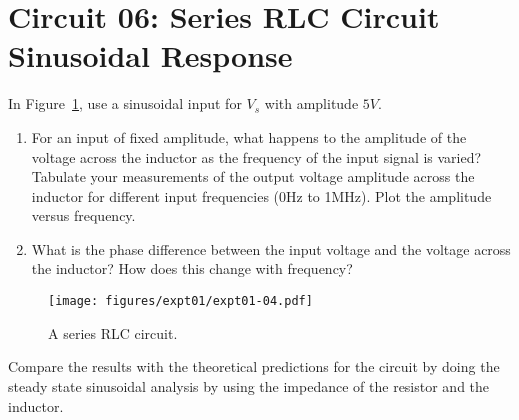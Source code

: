 \section{Circuit 06: Series RLC Circuit Sinusoidal Response}
In Figure~\ref{fig:expt01-04}, use a sinusoidal input for $V_s$ with amplitude $5V$. 
\begin{enumerate}
    \item For an input of fixed amplitude, what happens to the amplitude of the voltage across the inductor as the frequency of the input signal is varied? Tabulate your measurements of the output voltage amplitude across the inductor for different input frequencies (0Hz to 1MHz). Plot the amplitude versus frequency.
    \item What is the phase difference between the input voltage and the voltage across the inductor? How does this change with frequency?
\end{enumerate}
\begin{figure}[htbp]
    \centering
    \texttt{[image: figures/expt01/expt01-04.pdf]}
    \caption{A series RLC circuit.}
    \label{fig:expt01-04}
\end{figure}
Compare the results with the theoretical predictions for the circuit by doing the steady state sinusoidal analysis by using the impedance of the resistor and the inductor.
